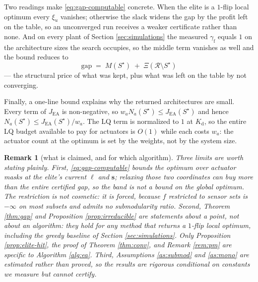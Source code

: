 \documentclass[letterpaper, 10pt, conference]{ieeeconf}
\newtheorem{remark}{Remark}
\begin{document}
Two readings make \eqref{eq:gap-computable} concrete. When the elite is a $1$-flip
local optimum every $\xi_u$ vanishes; otherwise the slack widens the gap by the
profit left on the table, so an unconverged run receives a weaker certificate
rather than none. And on every plant of Section \ref{sec:simulations} the measured
$\gamma_{\mathrm{f}}$ equals $1$ on the architecture sizes the search occupies, so
the middle term vanishes as well and the bound reduces to
\begin{equation}\label{eq:gap-simple}
  \mathrm{gap} \;=\; M(S^\star) \;+\; \Xi(\mathcal{R}\setminus S^\star)
\end{equation}
--- the structural price of what was kept, plus what was left on the table by not
converging.

Finally, a one-line bound explains why the returned architectures are small.
Every term of $J_\mathrm{EA}$ is non-negative, so $w_a N_a(S^\star) \le
J_\mathrm{EA}(S^\star)$ and hence $N_a(S^\star) \le J_\mathrm{EA}(S^\star)/w_a$.
The LQ term is normalized to $1$ at $K_\mathrm{d}$, so the entire LQ budget
available to pay for actuators is $O(1)$ while each costs $w_a$: the actuator
count at the optimum is set by the weights, not by the system size.

\begin{remark}[what is claimed, and for which algorithm]\label{rem:scope}
Three limits are worth stating plainly. First, \eqref{eq:gap-computable} bounds
the optimum over \emph{actuator} masks at the elite's current $\ell$ and
$\mathbf{s}$; relaxing those two coordinates can buy more than the entire
certified gap, so the band is not a bound on the global optimum. The restriction
is not cosmetic: it is forced, because $f$ restricted to sensor sets is $-\infty$
on most subsets and admits no submodularity ratio. Second, Theorem \ref{thm:gap}
and Proposition \ref{prop:irreducible} are statements about a \emph{point}, not
about an algorithm: they hold for any method that returns a $1$-flip local
optimum, including the greedy baseline of Section \ref{sec:simulations}. Only
Proposition \ref{prop:elite-hit}, the proof of Theorem \ref{thm:conv}, and Remark
\ref{rem:pm} are specific to Algorithm \ref{alg:ea}. Third, Assumptions
\ref{as:submod} and \ref{as:mono} are estimated rather than proved, so the
results are rigorous conditional on constants we measure but cannot certify.
\end{remark}
\end{document}
